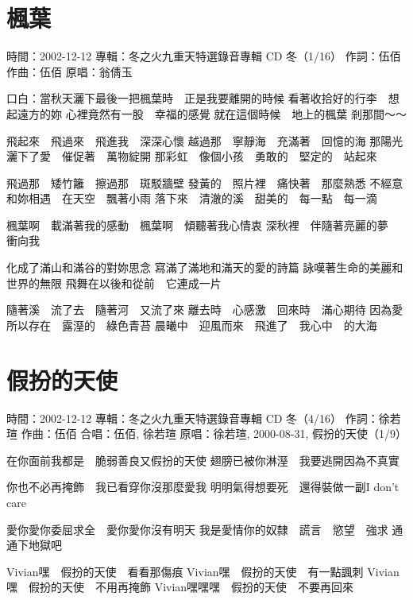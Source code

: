 \documentclass[UTF8,a4paper,oneside,twocolumn,12pt]{ctexbook}
\newcommand{\infopair}[2]{\textbullet #1：#2}
\newcommand{\zc}[1][伍佰]{\infopair{作詞}{#1}}
\newcommand{\zq}[1][伍佰]{\infopair{作曲}{#1}}
\newcommand{\zj}[1]{\infopair{專輯}{#1}}
\newcommand{\yc}[1]{\infopair{原唱}{#1}}
\newcommand{\sj}[1]{\infopair{時間}{#1}}
\newenvironment{info}{\begin{flushleft}\kaishu
	}
	{\end{flushleft}\normalsize\yahei\par}
\newenvironment{lyric}{
	}
{}
\begin{document}
\section{楓葉}
\begin{info}
	\sj{2002-12-12}
	\zj{冬之火九重天特選錄音專輯 CD 冬（1/16）}
	\zc
	\zq
	\yc{翁倩玉}
\end{info}
\begin{lyric}
	口白：當秋天灑下最後一把楓葉時　正是我要離開的時候
	看著收拾好的行李　想起遠方的妳
	心裡竟然有一股　幸福的感覺
	就在這個時候　地上的楓葉
	剎那間～～

	飛起來　飛過來　飛進我　深深心懷
	越過那　寧靜海　充滿著　回憶的海
	那陽光　灑下了愛　催促著　萬物綻開
	那彩虹　像個小孩　勇敢的　堅定的　站起來

	飛過那　矮竹籬　擦過那　斑駁牆壁
	發黃的　照片裡　痛快著　那麼熟悉
	不經意　和妳相遇　在天空　飄著小雨
	落下來　清澈的溪　甜美的　每一點　每一滴

	楓葉啊　載滿著我的感動　楓葉啊　傾聽著我心情衷
	深秋裡　伴隨著亮麗的夢　衝向我

	化成了滿山和滿谷的對妳思念
	寫滿了滿地和滿天的愛的詩篇
	詠嘆著生命的美麗和世界的無限
	飛舞在以後和從前　它連成一片

	隨著溪　流了去　隨著河　又流了來
	離去時　心感激　回來時　滿心期待
	因為愛　所以存在　露溼的　綠色青苔
	晨曦中　迎風而來　飛進了　我心中　的大海
\end{lyric}

\section{假扮的天使}
\begin{info}
	\sj{2002-12-12}
	\zj{冬之火九重天特選錄音專輯 CD 冬（4/16）}
	\zc[徐若瑄]
	\zq
	\infopair{合唱}{伍佰, 徐若瑄}
	\yc{徐若瑄, 2000-08-31, 假扮的天使（1/9）}
\end{info}
\begin{lyric}
	在你面前我都是　脆弱善良又假扮的天使
	翅膀已被你淋溼　我要逃開因為不真實

	你也不必再掩飾　我已看穿你沒那麼愛我
	明明氣得想要死　還得裝做一副I don't care

	愛你愛你委屈求全　愛你愛你沒有明天
	我是愛情你的奴隸　謊言　慾望　強求
	通通下地獄吧

	Vivian嘿　假扮的天使　看看那傷痕
	Vivian嘿　假扮的天使　有一點諷刺
	Vivian嘿　假扮的天使　不用再掩飾
	Vivian嘿嘿嘿　假扮的天使　不要再回來
\end{lyric}
\end{document}
